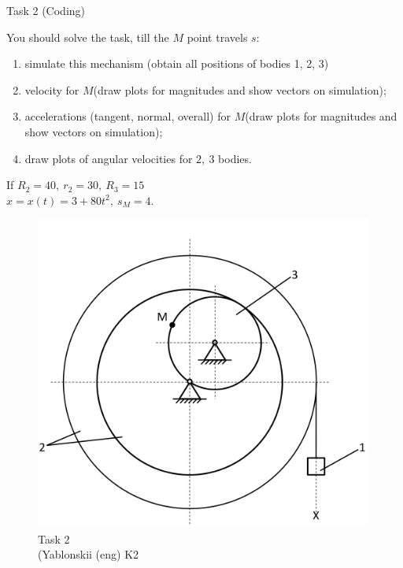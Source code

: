 \documentclass[aspectratio=169]{beamer}
\begin{document}
\begin{frame}[t]{Task 2 (Coding)}
    \vspace*{-0.2cm}
\begin{minipage}{0.6\textwidth}
    You should solve the task, till the $M$ point travels $s$:
    \begin{enumerate}
        \item simulate this mechanism (obtain all positions of bodies 1, 2, 3)
        \item velocity for $M$(draw plots for magnitudes and show vectors on simulation);
        \item accelerations (tangent, normal, overall) for $M$(draw plots for magnitudes and show vectors on simulation);
        \item draw plots of angular velocities for $2,\ 3$ bodies.
    \end{enumerate}
    If $R_2=40,\ r_2=30,\ R_3=15$\\ 
    $x=x(t)=3+80t^2,\ s_M=4$.
    
    \end{minipage}
    \begin{minipage}{0.39\textwidth}
          \begin{figure}[H]
        \includegraphics[width=0.99\textwidth]{HW1_2.png}
        \caption*{Task 2 \\ (Yablonskii (eng) K2}
        \end{figure}
    \end{minipage}
\end{frame}
\end{document}
